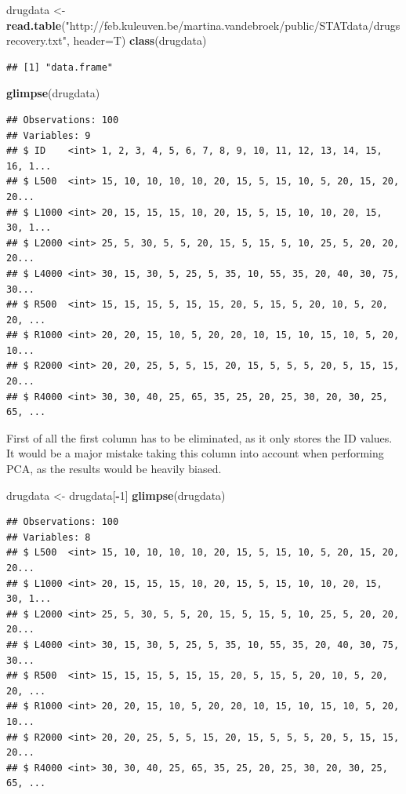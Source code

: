\documentclass[]{article}
\newenvironment{Shaded}{\begin{snugshade}}{\end{snugshade}}
\newcommand{\KeywordTok}[1]{\textcolor[rgb]{0.13,0.29,0.53}{\textbf{#1}}}
\newcommand{\DataTypeTok}[1]{\textcolor[rgb]{0.13,0.29,0.53}{#1}}
\newcommand{\DecValTok}[1]{\textcolor[rgb]{0.00,0.00,0.81}{#1}}
\newcommand{\StringTok}[1]{\textcolor[rgb]{0.31,0.60,0.02}{#1}}
\newcommand{\OperatorTok}[1]{\textcolor[rgb]{0.81,0.36,0.00}{\textbf{#1}}}
\newcommand{\NormalTok}[1]{#1}
\begin{document}
\begin{Shaded}
\begin{Highlighting}[]
\NormalTok{drugdata <-}\StringTok{ }\KeywordTok{read.table}\NormalTok{(}\StringTok{"http://feb.kuleuven.be/martina.vandebroek/public/STATdata/drugsrecovery.txt"}\NormalTok{, }\DataTypeTok{header=}\NormalTok{T)}
\KeywordTok{class}\NormalTok{(drugdata)}
\end{Highlighting}
\end{Shaded}

\begin{verbatim}
## [1] "data.frame"
\end{verbatim}

\begin{Shaded}
\begin{Highlighting}[]
\KeywordTok{glimpse}\NormalTok{(drugdata)}
\end{Highlighting}
\end{Shaded}

\begin{verbatim}
## Observations: 100
## Variables: 9
## $ ID    <int> 1, 2, 3, 4, 5, 6, 7, 8, 9, 10, 11, 12, 13, 14, 15, 16, 1...
## $ L500  <int> 15, 10, 10, 10, 10, 20, 15, 5, 15, 10, 5, 20, 15, 20, 20...
## $ L1000 <int> 20, 15, 15, 15, 10, 20, 15, 5, 15, 10, 10, 20, 15, 30, 1...
## $ L2000 <int> 25, 5, 30, 5, 5, 20, 15, 5, 15, 5, 10, 25, 5, 20, 20, 20...
## $ L4000 <int> 30, 15, 30, 5, 25, 5, 35, 10, 55, 35, 20, 40, 30, 75, 30...
## $ R500  <int> 15, 15, 15, 5, 15, 15, 20, 5, 15, 5, 20, 10, 5, 20, 20, ...
## $ R1000 <int> 20, 20, 15, 10, 5, 20, 20, 10, 15, 10, 15, 10, 5, 20, 10...
## $ R2000 <int> 20, 20, 25, 5, 5, 15, 20, 15, 5, 5, 5, 20, 5, 15, 15, 20...
## $ R4000 <int> 30, 30, 40, 25, 65, 35, 25, 20, 25, 30, 20, 30, 25, 65, ...
\end{verbatim}

First of all the first column has to be eliminated, as it only stores
the ID values. It would be a major mistake taking this column into
account when performing PCA, as the results would be heavily biased.

\begin{Shaded}
\begin{Highlighting}[]
\NormalTok{drugdata <-}\StringTok{ }\NormalTok{drugdata[}\OperatorTok{-}\DecValTok{1}\NormalTok{]}
\KeywordTok{glimpse}\NormalTok{(drugdata)}
\end{Highlighting}
\end{Shaded}

\begin{verbatim}
## Observations: 100
## Variables: 8
## $ L500  <int> 15, 10, 10, 10, 10, 20, 15, 5, 15, 10, 5, 20, 15, 20, 20...
## $ L1000 <int> 20, 15, 15, 15, 10, 20, 15, 5, 15, 10, 10, 20, 15, 30, 1...
## $ L2000 <int> 25, 5, 30, 5, 5, 20, 15, 5, 15, 5, 10, 25, 5, 20, 20, 20...
## $ L4000 <int> 30, 15, 30, 5, 25, 5, 35, 10, 55, 35, 20, 40, 30, 75, 30...
## $ R500  <int> 15, 15, 15, 5, 15, 15, 20, 5, 15, 5, 20, 10, 5, 20, 20, ...
## $ R1000 <int> 20, 20, 15, 10, 5, 20, 20, 10, 15, 10, 15, 10, 5, 20, 10...
## $ R2000 <int> 20, 20, 25, 5, 5, 15, 20, 15, 5, 5, 5, 20, 5, 15, 15, 20...
## $ R4000 <int> 30, 30, 40, 25, 65, 35, 25, 20, 25, 30, 20, 30, 25, 65, ...
\end{verbatim}
\end{document}
